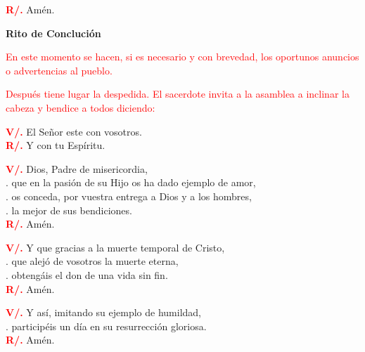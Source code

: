 \documentclass[12pt, letterpaper]{report}
\begin{document}
	\noindent
	\Large {\bfseries \textcolor{red}{R/.}} \hspace{0.5cm} Am\'en.

	\begin{center}
	\Huge {\bfseries Rito de Concluci\'on}
	\end{center}

	\large{\textcolor{red}{En este momento se hacen, si es necesario y con brevedad, los oportunos anuncios o advertencias al pueblo.}}

	\large{\textcolor{red}{Despu\'es tiene lugar la despedida. El sacerdote invita a la asamblea a inclinar la cabeza y bendice a todos diciendo:}}

	\noindent
	\Large {\bfseries \textcolor{red}{V/.}} \hspace{0.5cm} El Se\~nor este con vosotros.\\
	\noindent
	\Large {\bfseries \textcolor{red}{R/.}} \hspace{0.5cm} Y con tu Esp\'iritu.

	\noindent
	\Large {\bfseries \textcolor{red}{V/.}} \hspace{0.5cm} Dios, Padre de misericordia,\\
	. \hspace{1.5cm} que en la pasión de su Hijo os ha dado ejemplo de amor,\\
	. \hspace{1.5cm} os conceda, por vuestra entrega a Dios y a los hombres,\\
	. \hspace{1.5cm} la mejor de sus bendiciones.\\
	\Large {\bfseries \textcolor{red}{R/.}} \hspace{0.5cm} Am\'en.

	\newpage

	\noindent
	\Large {\bfseries \textcolor{red}{V/.}} \hspace{0.5cm} Y que gracias a la muerte temporal de Cristo,\\
	. \hspace{1.5cm} que alejó de vosotros la muerte eterna,\\
	. \hspace{1.5cm} obtengáis el don de una vida sin fin.\\
	\Large {\bfseries \textcolor{red}{R/.}} \hspace{0.5cm} Am\'en.

	\noindent
	\Large {\bfseries \textcolor{red}{V/.}} \hspace{0.5cm} Y así, imitando su ejemplo de humildad,\\
	. \hspace{1.5cm} participéis un día en su resurrección gloriosa.\\
	\Large {\bfseries \textcolor{red}{R/.}} \hspace{0.5cm} Am\'en.
\end{document}
